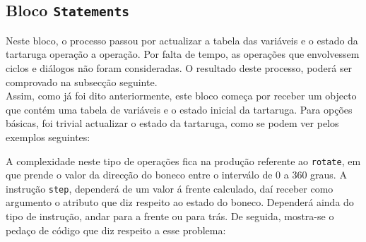 \documentclass[11pt,a4paper]{article}
\begin{document}

\subsection{Bloco \texttt{Statements}}
Neste bloco, o processo passou por actualizar a tabela das variáveis e o estado da tartaruga operação a operação. Por falta de tempo, as operações que envolvessem ciclos e diálogos não 
foram consideradas. O resultado deste processo, poderá ser comprovado na subsecção seguinte.\\

Assim, como já foi dito anteriormente, este bloco começa por receber um objecto que contém uma tabela de variáveis e o estado inicial da tartaruga. Para opções básicas, foi trivial 
actualizar o estado da tartaruga, como se podem ver pelos exemplos seguintes:\\


A complexidade neste tipo de operações fica na produção referente ao \texttt{rotate}, em que prende o valor da direcção do boneco entre o interválo de 0 a 360 graus. A instrução 
\texttt{step}, dependerá de um valor á frente calculado, daí receber como argumento o atributo que diz respeito ao estado do boneco. Dependerá ainda do tipo de instrução, andar para a 
frente ou para trás. De seguida, mostra-se o pedaço de código que diz respeito a esse problema:
\end{document}
